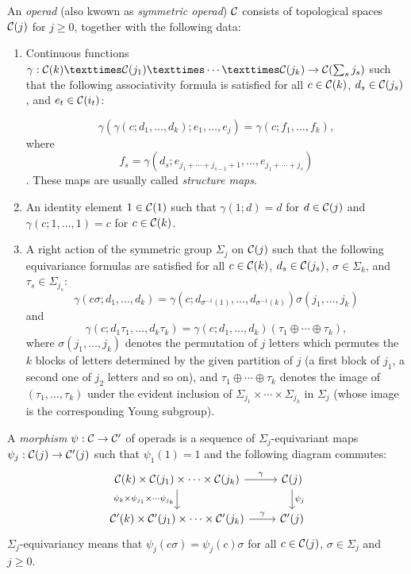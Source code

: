 \documentclass[TFM.tex]{subfiles}
\begin{document}
\begin{defi}\label{operadtop}
An \emph{operad} (also kwown as \emph{symmetric operad}) $\mathcal{C}$ consists of topological spaces $\mathcal{C}(j)$ for $j\geq 0$, %
together with the following data:
\begin{enumerate}[(1)]
\item Continuous functions $\gamma : \CC(k) × \CC(j_1) × \cdots × \CC(j_k) \to \CC(\sum_s j_s)$ such that the
following associativity formula is satisfied for all $c\in \mathcal{C}(k)$, $d_s \in \mathcal{C}(j_s)$, and $e_t \in \mathcal{C}(i_t)$:

\[\gamma(
\gamma(c; d_1, \dots , d_k); e_1, \dots , e_j) = 
\gamma(c; f_1, \dots , f_k),
\]
where $$f_s = \gamma(d_s; e_{j_1+\cdots+j_{s−1}+1}, \dots , e_{j_1+\cdots+j_s} )$$.%
These maps are usually called \emph{structure maps}.

\item An identity element $1 \in \mathcal{C}(1)$ such that 
$\gamma(1; d) = d$ for $d \in \mathcal{C}(j)$ and 
$\gamma(c; 1,\dots,1) = c$ for
$c \in \mathcal{C}(k)$.

\item A right action of the symmetric group $\Sigma_j$ on $\mathcal{C}(j)$ such that the following equivariance
formulas are satisfied for all $c\in \mathcal{C}(k)$, $d_s \in \mathcal{C}(j_s)$, $\sigma\in\Sigma_k$, and $\tau_s\in\Sigma_{j_s}$:
\[
\gamma(c\sigma; d_1, \dots , d_k) = 
\gamma(c; d_{\sigma^{−1}(1)}, \dots , d_{\sigma^{−1}(k)})\sigma(j_1, \dots , j_k)
\]
and 
\[
\gamma(c; d_1\tau_1, \dots , d_k\tau_k) = \gamma(c; d_1, \dots , d_k)(\tau_1\oplus\cdots\oplus\tau_k),
\] 
where $\sigma(j_1, \dots , j_k)$ denotes the
permutation of $j$ letters which permutes the $k$ blocks of letters determined by the given
partition of $j$ (a first block of $j_1$, a second one of $j_2$ letters and so on), and $\tau_1\oplus\cdots\oplus\tau_k$ denotes the image of $(\tau_1, \dots , \tau_k)$ under the evident inclusion of $\Sigma_{j_1} × \cdots × \Sigma_{j_k}$ in $\Sigma_j$ (whose image is the corresponding Young subgroup).
\end{enumerate}
\end{defi}



\begin{defi}
A \emph{morphism} $\psi:\mathcal{C} \to \mathcal{C}'$ of operads is a sequence of $\Sigma_j$-equivariant maps  $\psi_j : \mathcal{C}(j)\to \mathcal{C}'(j)$ such that
 $\psi_1(1) = 1$ and the following diagram commutes:
 \[
 \begin{tikzcd}
\CC(k)\times \CC(j_1)\times\cdots\times \CC(j_k) \arrow[r, "\gamma"] \arrow[d, "\psi_k\times\psi_{j_1}\times\cdots\psi_{j_k}"'] & \CC(j) \arrow[d, "\psi_j"] \\
\CC'(k)\times \CC'(j_1)\times\cdots\times \CC'(j_k) \arrow[r, "\gamma"]                                                         & \CC'(j)                   
\end{tikzcd}\]
$\Sigma_j$-equivariancy means that $\psi_j(c\sigma)=\psi_j(c)\sigma$ for all $c\in \mathcal{C}(j)$, $\sigma\in\Sigma_j$ and $j\geq 0$. 
\end{defi}
\end{document}
